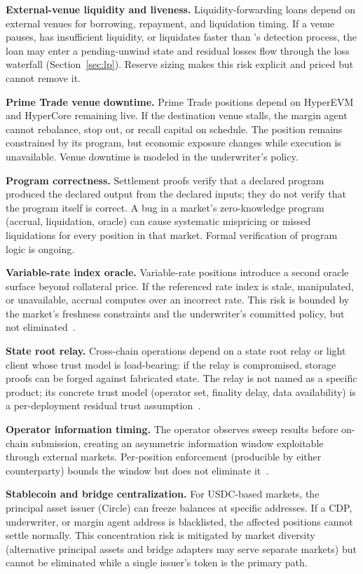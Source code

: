 \textbf{External-venue liquidity and liveness.} Liquidity-forwarding loans depend on external venues for borrowing, repayment, and liquidation timing. If a venue pauses, has insufficient liquidity, or liquidates faster than \daloc{}'s detection process, the loan may enter a pending-unwind state and residual losses flow through the loss waterfall (Section~\ref{sec:lp}). Reserve sizing makes this risk explicit and priced but cannot remove it.

\textbf{Prime Trade venue downtime.} Prime Trade positions depend on HyperEVM and HyperCore remaining live. If the destination venue stalls, the margin agent cannot rebalance, stop out, or recall capital on schedule. The position remains constrained by its program, but economic exposure changes while execution is unavailable. Venue downtime is modeled in the underwriter's policy.

\textbf{Program correctness.} Settlement proofs verify that a declared program produced the declared output from the declared inputs; they do not verify that the program itself is correct. A bug in a market's zero-knowledge program (accrual, liquidation, oracle) can cause systematic mispricing or missed liquidations for every position in that market. Formal verification of program logic is ongoing.

\textbf{Variable-rate index oracle.} Variable-rate positions introduce a second oracle surface beyond collateral price. If the referenced rate index is stale, manipulated, or unavailable, accrual computes over an incorrect rate. This risk is bounded by the market's freshness constraints and the underwriter's committed policy, but not eliminated~\cite{daloc-decent2026}.

\textbf{State root relay.} Cross-chain operations depend on a state root relay or light client whose trust model is load-bearing: if the relay is compromised, storage proofs can be forged against fabricated state. The relay is not named as a specific product; its concrete trust model (operator set, finality delay, data availability) is a per-deployment residual trust assumption~\cite{daloc-decent2026}.

\textbf{Operator information timing.} The operator observes sweep results before on-chain submission, creating an asymmetric information window exploitable through external markets. Per-position enforcement (producible by either counterparty) bounds the window but does not eliminate it~\cite{daloc-decent2026}.

\textbf{Stablecoin and bridge centralization.} For USDC-based markets, the principal asset issuer (Circle) can freeze balances at specific addresses. If a CDP, underwriter, or margin agent address is blacklisted, the affected positions cannot settle normally. This concentration risk is mitigated by market diversity (alternative principal assets and bridge adapters may serve separate markets) but cannot be eliminated while a single issuer's token is the primary path.

